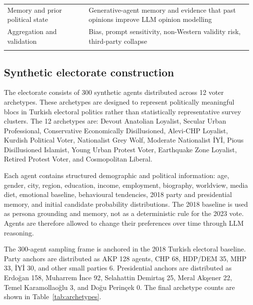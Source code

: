\documentclass[pdflatex,sn-mathphys-num,iicol]{sn-jnl}
\begin{document}
\begin{table}[t]
\begin{tabular}{@{}p{}p{}p{}@{}}
Memory and prior political state & \cite{park2023generative,hwang2023aligning} & Generative-agent memory and evidence that past opinions improve LLM opinion modelling \\
Aggregation and validation & \cite{kang2026dynamok,kreutner2026ep,qu2024performance,rettenberger2025politicalbias} & Bias, prompt sensitivity, non-Western validity risk, third-party collapse \\
\botrule
\end{tabular}
\normalsize
\end{table}

\subsection{Synthetic electorate construction}\label{subsec:electorate}

The electorate consists of 300 synthetic agents distributed across 12 voter archetypes. These archetypes are designed to represent politically meaningful blocs in Turkish electoral politics rather than statistically representative survey clusters. The 12 archetypes are: Devout Anatolian Loyalist, Secular Urban Professional, Conservative Economically Disillusioned, Alevi-CHP Loyalist, Kurdish Political Voter, Nationalist Grey Wolf, Moderate Nationalist İYİ, Pious Disillusioned Islamist, Young Urban Protest Voter, Earthquake Zone Loyalist, Retired Protest Voter, and Cosmopolitan Liberal.

Each agent contains structured demographic and political information: age, gender, city, region, education, income, employment, biography, worldview, media diet, emotional baseline, behavioural tendencies, 2018 party and presidential memory, and initial candidate probability distributions. The 2018 baseline is used as persona grounding and memory, not as a deterministic rule for the 2023 vote. Agents are therefore allowed to change their preferences over time through LLM reasoning.

The 300-agent sampling frame is anchored in the 2018 Turkish electoral baseline. Party anchors are distributed as AKP 128 agents, CHP 68, HDP/DEM 35, MHP 33, İYİ 30, and other small parties 6. Presidential anchors are distributed as Erdoğan 158, Muharrem İnce 92, Selahattin Demirtaş 25, Meral Akşener 22, Temel Karamollaoğlu 3, and Doğu Perinçek 0. The final archetype counts are shown in Table~\ref{tab:archetypes}.
\end{document}
